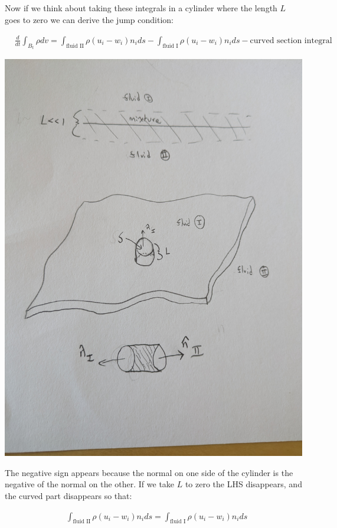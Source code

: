 \documentclass[a4paper,12pt]{article}
\begin{document}
Now if we think about taking these integrals in a cylinder where the length $L$ goes to zero we can derive the jump condition:

\begin{align}
  &\frac{d}{dt}\int_{B_t} \rho dv = \int_{\text{fluid II}} \rho (u_i - w_i) n_i ds - \int_{\text{fluid I}} \rho (u_i - w_i) n_i ds - \text{curved section integral}
\end{align}

\includegraphics[scale=.1]{fluid_interface.jpg}

The negative sign appears because the normal on one side of the cylinder is the negative of the normal on the other. If we take $L$ to zero the LHS disappears, and the curved part disappears so that:

\begin{align}
  &\int_{\text{fluid II}} \rho (u_i - w_i) n_i ds = \int_{\text{fluid I}} \rho (u_i - w_i) n_i ds
\end{align}
\end{document}
